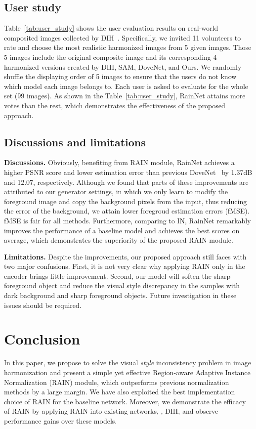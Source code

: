 \documentclass[final]{cvpr}
\begin{document}
\subsection{User study} 
\label{subsec:user_study}
Table~\ref{tab:user_study} shows the user evaluation results on real-world composited images collected by DIH~\cite{tsai2017deep}. Specifically, we invited 11 volunteers to rate and choose the most realistic harmonized images from 5 given images. Those 5 images include the original composite image and its corresponding 4 harmonized versions created by DIH, SAM, DoveNet, and Ours. We randomly shuffle the displaying order of 5 images to ensure that the users do not know which model each image belongs to. Each user is asked to evaluate for the whole set (99 images). As shown in the Table~\ref{tab:user_study}, RainNet attains more votes than the rest, which demonstrates the effectiveness of the proposed approach. 


\subsection{Discussions and limitations}
\label{subsec:limitation_discussion}
\noindent\textbf{Discussions.} Obviously, benefiting from RAIN module, RainNet achieves a higher PSNR score and lower estimation error than previous DoveNet~\cite{cong2020dovenet} by 1.37dB and 12.07, respectively. Although we found that parts of these improvements are attributed to our generator settings, in which we only learn to modify the foreground image and copy the background pixels from the input, thus reducing the error of the background, we attain lower foregroud estimation errors (fMSE). fMSE is fair for all methods. Furthermore, comparing to IN, RainNet remarkably improves the performance of a baseline model and achieves the best scores on average, which demonstrates the superiority of the proposed RAIN module. 

\noindent\textbf{Limitations.} Despite the improvements, our proposed approach still faces with two major confusions. First, it is not very clear why applying RAIN only in the encoder brings little improvement. Second, our model will soften the sharp foreground object and reduce the visual style discrepancy in the samples with dark background and sharp foreground objects. Future investigation in these issues should be required. 

\section{Conclusion}
\label{sec:conclusion}
In this paper, we propose to solve the visual \emph{style} inconsistency problem in image harmonization and present a simple yet effective Region-aware Adaptive Instance Normalization (RAIN) module, which outperforms previous normalization methods by a large margin. We have also exploited the best implementation choice of RAIN for the baseline network. Moreover, we demonstrate the efficacy of RAIN by applying RAIN into existing networks, \eg, DIH, and observe performance gains over these models. 
\end{document}
